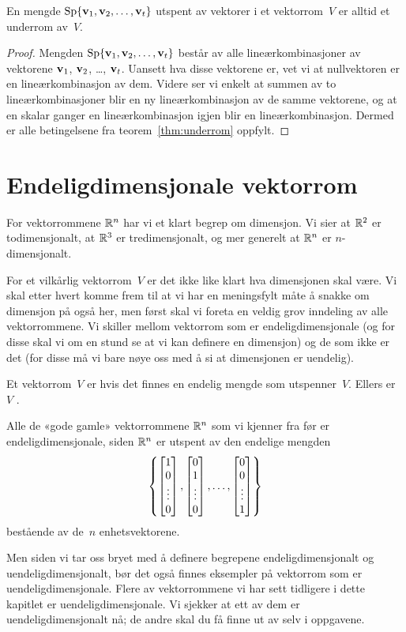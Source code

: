 \begin{thm}
\label{thm:underrom-sp}
En mengde $\operatorname{Sp} \{ \mathbf{v}_1, \mathbf{v}_2, \ldots, \mathbf{v}_t \}$ utspent av vektorer
i et vektorrom~$V$ er alltid et underrom av~$V$.
\end{thm}
\begin{proof}
Mengden $\operatorname{Sp} \{ \mathbf{v}_1, \mathbf{v}_2, \ldots, \mathbf{v}_t \}$ består av alle
lineærkombinasjoner av vektorene $\mathbf{v}_1$, $\mathbf{v}_2$, \ldots,
$\mathbf{v}_t$.  Uansett hva disse vektorene er, vet vi at nullvektoren er
en lineærkombinasjon av dem.  Videre ser vi enkelt at summen av to
lineærkombinasjoner blir en ny lineærkombinasjon av de samme
vektorene, og at en skalar ganger en lineærkombinasjon igjen blir en
lineærkombinasjon.  Dermed er alle betingelsene fra
teorem~\ref{thm:underrom} oppfylt.
\end{proof}



\section*{Endeligdimensjonale vektorrom}

For vektorrommene $\mathbb{R}^n$ har vi et klart begrep om dimensjon.  Vi sier
at $\mathbb{R}^2$ er todimensjonalt, at $\mathbb{R}^3$ er tredimensjonalt, og mer
generelt at $\mathbb{R}^n$ er $n$-dimensjonalt.

For et vilkårlig vektorrom~$V$ er det ikke like klart hva dimensjonen
skal være.  Vi skal etter hvert komme frem til at vi har en
meningsfylt måte å snakke om dimensjon på også her, men først skal vi
foreta en veldig grov inndeling av alle vektorrommene.  Vi skiller
mellom vektorrom som er endeligdimensjonale (og for disse skal vi om
en stund se at vi kan definere en dimensjon) og de som ikke er det
(for disse må vi bare nøye oss med å si at dimensjonen er uendelig).

\begin{defn}
Et vektorrom~$V$ er  hvis det finnes en
endelig mengde som utspenner~$V$.  Ellers er~$V$
.
\end{defn}

Alle de «gode gamle» vektorrommene $\mathbb{R}^n$ som vi kjenner fra før er
endeligdimensjonale, siden $\mathbb{R}^n$ er utspent av den endelige mengden
\[
\left\{
\begin{bmatrix} 1 \\ 0 \\ \vdots \\ 0 \end{bmatrix},
\begin{bmatrix} 0 \\ 1 \\ \vdots \\ 0 \end{bmatrix},
\ldots,
\begin{bmatrix} 0 \\ 0 \\ \vdots \\ 1 \end{bmatrix}
\right\}
\]
bestående av de~$n$ enhetsvektorene.

Men siden vi tar oss bryet med å definere begrepene
endeligdimensjonalt og uendeligdimensjonalt, bør det også finnes
eksempler på vektorrom som er uendeligdimensjonale.  Flere av
vektorrommene vi har sett tidligere i dette kapitlet er
uendeligdimensjonale.  Vi sjekker at ett av dem er
uendeligdimensjonalt nå; de andre skal du få finne ut av selv i
oppgavene.

